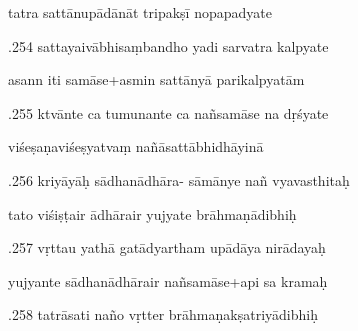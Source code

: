 \documentclass[article,12pt,a4paper]{memoir}%
\newcounter{parCount}
\begin{document}
	  
	  \pstart \leavevmode%
	tatra sattānupādānāt tripakṣī nopapadyate 
	{}
	\pend%
      

	  
	  \pstart {}.254 sattayaivābhisaṃbandho yadi sarvatra kalpyate 
	{}
	\pend%
      

	  
	  \pstart \leavevmode%
	asann iti samāse+asmin sattānyā parikalpyatām 
	{}
	\pend%
      

	  
	  \pstart {}.255 ktvānte ca tumunante ca nañsamāse na dṛśyate 
	{}
	\pend%
      

	  
	  \pstart \leavevmode%
	viśeṣaṇaviśeṣyatvaṃ nañāsattābhidhāyinā 
	{}
	\pend%
      

	  
	  \pstart {}.256 kriyāyāḥ sādhanādhāra- sāmānye nañ vyavasthitaḥ 
	{}
	\pend%
      

	  
	  \pstart \leavevmode%
	tato viśiṣṭair ādhārair yujyate brāhmaṇādibhiḥ 
	{}
	\pend%
      

	  
	  \pstart {}.257 vṛttau yathā gatādyartham upādāya nirādayaḥ 
	{}
	\pend%
      

	  
	  \pstart \leavevmode%
	yujyante sādhanādhārair nañsamāse+api sa kramaḥ 
	{}
	\pend%
      

	  
	  \pstart {}.258 tatrāsati naño vṛtter   brāhmaṇakṣatriyādibhiḥ 
	{}
	\pend%
      
\end{document}
